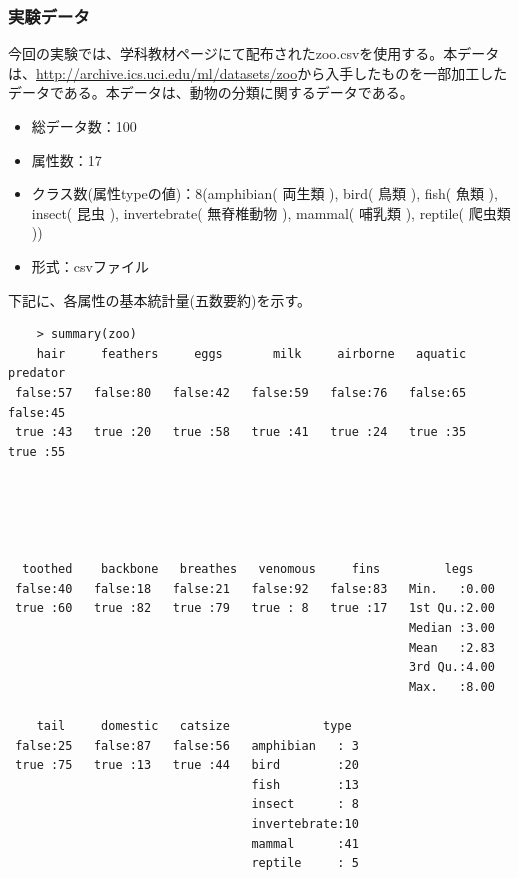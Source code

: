 \documentclass[dvipdfmx]{jsarticle}
\begin{document}
\subsubsection{実験データ}
今回の実験では、学科教材ページにて配布されたzoo.csvを使用する。本データは、\url{http://archive.ics.uci.edu/ml/datasets/zoo}から入手したものを一部加工したデータである。本データは、動物の分類に関するデータである。
\begin{itemize}
  \item 総データ数：100
  \item 属性数：17
  \item クラス数(属性typeの値)：8(amphibian( 両生類 ), bird( 鳥類 ), fish( 魚類 ), insect( 昆虫 ), invertebrate( 無脊椎動物 ), mammal( 哺乳類 ), reptile( 爬虫類 ))
  \item 形式：csvファイル
\end{itemize}
下記に、各属性の基本統計量(五数要約)を示す。
\begin{center}
  \begin{verbatim}
    > summary(zoo)
    hair     feathers     eggs       milk     airborne   aquatic    predator
 false:57   false:80   false:42   false:59   false:76   false:65   false:45
 true :43   true :20   true :58   true :41   true :24   true :35   true :55





  toothed    backbone   breathes   venomous     fins         legs
 false:40   false:18   false:21   false:92   false:83   Min.   :0.00
 true :60   true :82   true :79   true : 8   true :17   1st Qu.:2.00
                                                        Median :3.00
                                                        Mean   :2.83
                                                        3rd Qu.:4.00
                                                        Max.   :8.00

    tail     domestic   catsize             type
 false:25   false:87   false:56   amphibian   : 3
 true :75   true :13   true :44   bird        :20
                                  fish        :13
                                  insect      : 8
                                  invertebrate:10
                                  mammal      :41
                                  reptile     : 5

  \end{verbatim}
\end{center}
\end{document}
